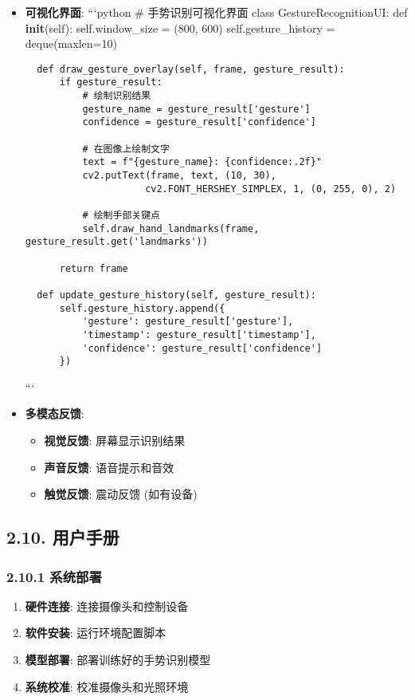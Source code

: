 \begin{itemize}
\item
  \textbf{可视化界面}: ```python \# 手势识别可视化界面 class
  GestureRecognitionUI: def \textbf{init}(self): self.window\_size =
  (800, 600) self.gesture\_history = deque(maxlen=10)

\begin{lstlisting}
  def draw_gesture_overlay(self, frame, gesture_result):
      if gesture_result:
          # 绘制识别结果
          gesture_name = gesture_result['gesture']
          confidence = gesture_result['confidence']

          # 在图像上绘制文字
          text = f"{gesture_name}: {confidence:.2f}"
          cv2.putText(frame, text, (10, 30), 
                     cv2.FONT_HERSHEY_SIMPLEX, 1, (0, 255, 0), 2)

          # 绘制手部关键点
          self.draw_hand_landmarks(frame, gesture_result.get('landmarks'))

      return frame

  def update_gesture_history(self, gesture_result):
      self.gesture_history.append({
          'gesture': gesture_result['gesture'],
          'timestamp': gesture_result['timestamp'],
          'confidence': gesture_result['confidence']
      })
\end{lstlisting}

  ```
\item
  \textbf{多模态反馈}:

  \begin{itemize}
  \tightlist
  \item
    \textbf{视觉反馈}: 屏幕显示识别结果
  \item
    \textbf{声音反馈}: 语音提示和音效
  \item
    \textbf{触觉反馈}: 震动反馈 (如有设备)
  \end{itemize}
\end{itemize}

\subsection{2.10. 用户手册}\label{ux7528ux6237ux624bux518c}

\subsubsection{2.10.1 系统部署}\label{ux7cfbux7edfux90e8ux7f72}

\begin{enumerate}
\def\labelenumi{\arabic{enumi}.}
\tightlist
\item
  \textbf{硬件连接}: 连接摄像头和控制设备
\item
  \textbf{软件安装}: 运行环境配置脚本
\item
  \textbf{模型部署}: 部署训练好的手势识别模型
\item
  \textbf{系统校准}: 校准摄像头和光照环境
\end{enumerate}

